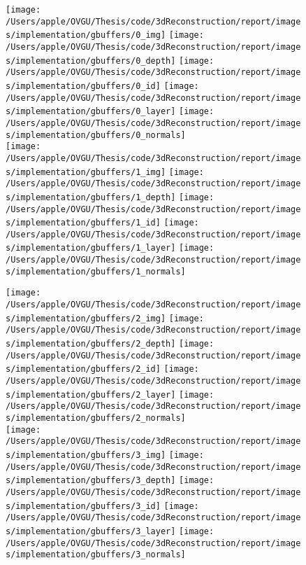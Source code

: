 \begin{figure}
    \centering
        \texttt{[image: /Users/apple/OVGU/Thesis/code/3dReconstruction/report/images/implementation/gbuffers/0\_img]}
        \texttt{[image: /Users/apple/OVGU/Thesis/code/3dReconstruction/report/images/implementation/gbuffers/0\_depth]}
        \texttt{[image: /Users/apple/OVGU/Thesis/code/3dReconstruction/report/images/implementation/gbuffers/0\_id]}
        \texttt{[image: /Users/apple/OVGU/Thesis/code/3dReconstruction/report/images/implementation/gbuffers/0\_layer]}
        \texttt{[image: /Users/apple/OVGU/Thesis/code/3dReconstruction/report/images/implementation/gbuffers/0\_normals]}\\
        \vspace{0.1cm}
        \texttt{[image: /Users/apple/OVGU/Thesis/code/3dReconstruction/report/images/implementation/gbuffers/1\_img]}
        \texttt{[image: /Users/apple/OVGU/Thesis/code/3dReconstruction/report/images/implementation/gbuffers/1\_depth]}
        \texttt{[image: /Users/apple/OVGU/Thesis/code/3dReconstruction/report/images/implementation/gbuffers/1\_id]}
        \texttt{[image: /Users/apple/OVGU/Thesis/code/3dReconstruction/report/images/implementation/gbuffers/1\_layer]}
        \texttt{[image: /Users/apple/OVGU/Thesis/code/3dReconstruction/report/images/implementation/gbuffers/1\_normals]}\\
        \vspace{0.1cm}

        \texttt{[image: /Users/apple/OVGU/Thesis/code/3dReconstruction/report/images/implementation/gbuffers/2\_img]}
        \texttt{[image: /Users/apple/OVGU/Thesis/code/3dReconstruction/report/images/implementation/gbuffers/2\_depth]}
        \texttt{[image: /Users/apple/OVGU/Thesis/code/3dReconstruction/report/images/implementation/gbuffers/2\_id]}
        \texttt{[image: /Users/apple/OVGU/Thesis/code/3dReconstruction/report/images/implementation/gbuffers/2\_layer]}
        \texttt{[image: /Users/apple/OVGU/Thesis/code/3dReconstruction/report/images/implementation/gbuffers/2\_normals]}\\
        \vspace{0.1cm}
        \texttt{[image: /Users/apple/OVGU/Thesis/code/3dReconstruction/report/images/implementation/gbuffers/3\_img]}
        \texttt{[image: /Users/apple/OVGU/Thesis/code/3dReconstruction/report/images/implementation/gbuffers/3\_depth]}
        \texttt{[image: /Users/apple/OVGU/Thesis/code/3dReconstruction/report/images/implementation/gbuffers/3\_id]}
        \texttt{[image: /Users/apple/OVGU/Thesis/code/3dReconstruction/report/images/implementation/gbuffers/3\_layer]}
        \texttt{[image: /Users/apple/OVGU/Thesis/code/3dReconstruction/report/images/implementation/gbuffers/3\_normals]}\\
    \vspace{0.1cm}


\end{figure}
